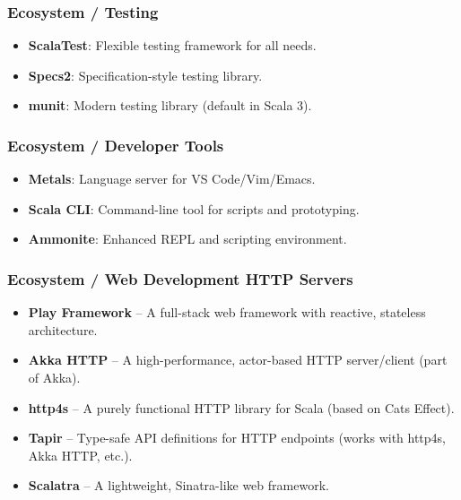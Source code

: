 \documentclass{beamer}
\begin{document}
\begin{frame}
\frametitle{Ecosystem / Testing }
\begin{itemize}
  \item \textbf{ScalaTest}: Flexible testing framework for all needs.
  \item \textbf{Specs2}: Specification-style testing library.
  \item \textbf{munit}: Modern testing library (default in Scala 3).
\end{itemize}
\end{frame}


\begin{frame}
\frametitle{Ecosystem / Developer Tools }
 \begin{itemize}
  \item \textbf{Metals}: Language server for VS Code/Vim/Emacs.
  \item \textbf{Scala CLI}: Command-line tool for scripts and prototyping.
  \item \textbf{Ammonite}: Enhanced REPL and scripting environment.
\end{itemize}
\end{frame}


\begin{frame}
\frametitle{Ecosystem / Web Development \text{\&} HTTP Servers }

\begin{itemize}
    \item \textbf{Play Framework} – A full-stack web framework with reactive, stateless architecture.
    \item \textbf{Akka HTTP} – A high-performance, actor-based HTTP server/client (part of Akka).
    \item \textbf{http4s} – A purely functional HTTP library for Scala (based on Cats Effect).
    \item \textbf{Tapir} – Type-safe API definitions for HTTP endpoints (works with http4s, Akka HTTP, etc.).
    \item \textbf{Scalatra} – A lightweight, Sinatra-like web framework.
\end{itemize}

\end{frame}
\end{document}

